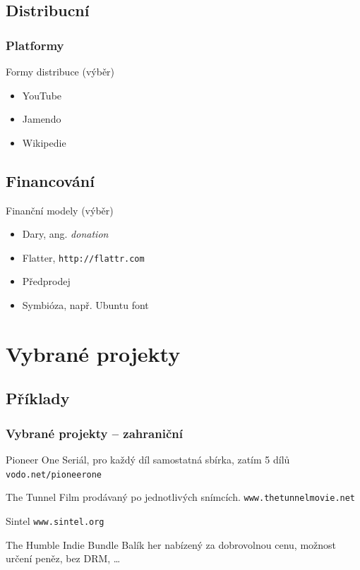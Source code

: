 \documentclass[xetex]{beamer}
\begin{document}
\subsection{Distribucní}
\begin{frame}
  \frametitle{Platformy}
  \begin{block}{Formy distribuce (výběr)}
  \begin{itemize}
    \item YouTube
    \item Jamendo
    \item Wikipedie
  \end{itemize}
  \end{block}
	\subsection{Financování}
  \begin{block}{Finanční modely (výběr)}
   \begin{itemize}
    \item Dary, ang. \emph{donation}
    \item Flatter, \texttt{http://flattr.com}
    \item Předprodej
    \item Symbióza, např. Ubuntu font
   \end{itemize}
  \end{block}
\end{frame}

\section{Vybrané projekty}
\subsection{Příklady}
\begin{frame}
  \frametitle{Vybrané projekty -- zahraniční}
  \begin{block}{Pioneer One}
	Seriál, pro každý díl samostatná sbírka, zatím 5 dílů
	\texttt{vodo.net/pioneerone}
  \end{block}

  \begin{block}{The Tunnel}
	Film prodávaný po jednotlivých snímcích.
	\texttt{www.thetunnelmovie.net}
  \end{block}

  \begin{block}{Sintel}
	\texttt{www.sintel.org}
  \end{block}

  \begin{block}{The Humble Indie Bundle}
	Balík her nabízený za dobrovolnou cenu, možnost určení peněz, bez DRM, \ldots{}
 \end{block}

\end{frame}
\end{document}
